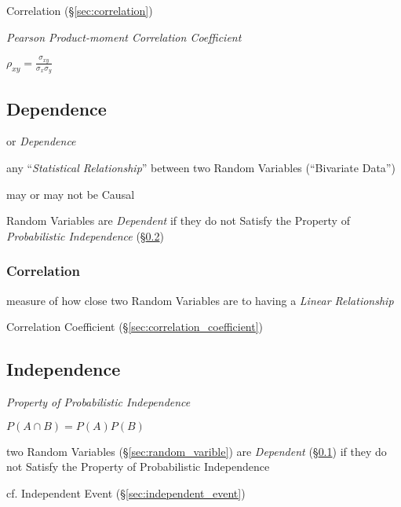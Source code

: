 \fist Correlation (\S\ref{sec:correlation})

\emph{Pearson Product-moment Correlation Coefficient}

$\rho_{xy} = \frac{\sigma_{xy}}{\sigma_x \sigma_y}$



\subsection{Dependence}\label{sec:dependence}

or \emph{Dependence}

any ``\emph{Statistical Relationship}'' between two Random Variables
(``Bivariate Data'')

may or may not be Causal

Random Variables are \emph{Dependent} if they do not Satisfy the Property of
\emph{Probabilistic Independence} (\S\ref{sec:independence})



\subsubsection{Correlation}\label{sec:statistical_correlation}

measure of how close two Random Variables are to having a \emph{Linear
  Relationship}

\fist Correlation Coefficient (\S\ref{sec:correlation_coefficient})



\subsection{Independence}\label{sec:independence}

\emph{Property of Probabilistic Independence}

$P(A \cap B) = P(A)P(B)$

two Random Variables (\S\ref{sec:random_varible}) are \emph{Dependent}
(\S\ref{sec:dependence}) if they do not Satisfy the Property of
Probabilistic Independence

\fist cf. Independent Event (\S\ref{sec:independent_event})



